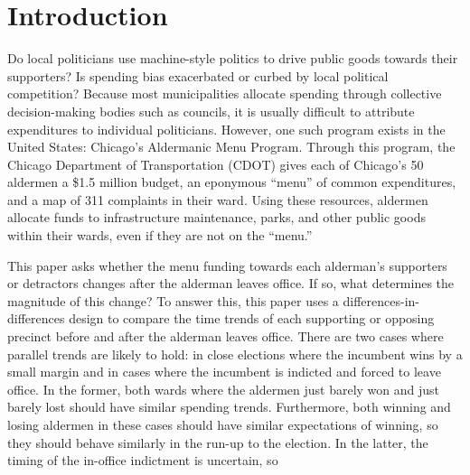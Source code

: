 \section{Introduction}\label{sec:Introduction}

Do local politicians use machine-style politics to drive public goods towards their supporters? Is spending bias exacerbated or curbed by local political competition?
Because most municipalities allocate spending through collective decision-making bodies such as councils, it is usually difficult to attribute expenditures to individual politicians.
However, one such program exists in the United States: Chicago's Aldermanic Menu Program.
Through this program, the Chicago Department of Transportation (CDOT) gives each of Chicago's 50 aldermen a \$1.5 million budget, an eponymous ``menu'' of common expenditures, and a map of 311 complaints in their ward.
Using these resources, aldermen allocate funds to infrastructure maintenance, parks, and other public goods within their wards, even if they are not on the ``menu.''

This paper asks whether the menu funding towards each alderman's supporters or detractors changes after the alderman leaves office.
If so, what determines the magnitude of this change? 
To answer this, this paper uses a differences-in-differences design to compare the time trends of each supporting or opposing precinct before and after the alderman leaves office.
There are two cases where parallel trends are likely to hold: in close elections where the incumbent wins by a small margin and in cases where the incumbent is indicted and forced to leave office.
In the former, both wards where the aldermen just barely won and just barely lost should have similar spending trends.
Furthermore, both winning and losing aldermen in these cases should have similar expectations of winning, so they should behave similarly in the run-up to the election.
In the latter, the timing of the in-office indictment is uncertain, so 


